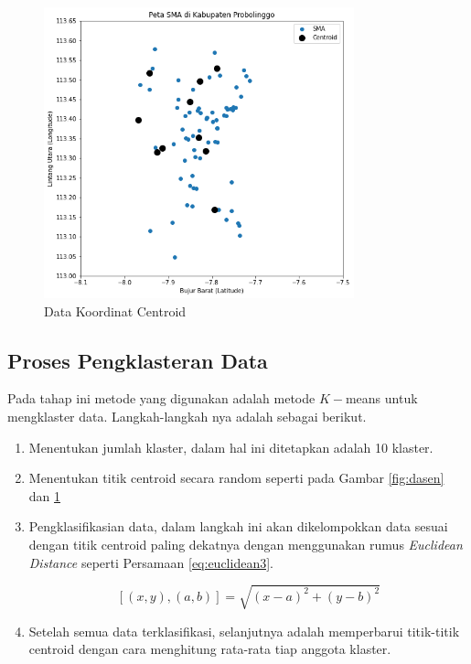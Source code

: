 \begin{figure}[h!]
	\centering
	\includegraphics[width=0.8\textwidth]{titik centroid.png}
	\caption{Data Koordinat Centroid}
	\label{fig:visdasen}
\end{figure}

\subsection{Proses Pengklasteran Data}

Pada tahap ini metode yang digunakan adalah metode $K-$means untuk mengklaster data. Langkah-langkah nya adalah sebagai berikut.

\begin{enumerate}
	\item Menentukan jumlah klaster, dalam hal ini ditetapkan adalah 10 klaster.
	\item Menentukan titik centroid secara random seperti pada Gambar \ref{fig:dasen} dan \ref{fig:visdasen}
	\item Pengklasifikasian data, dalam langkah ini akan dikelompokkan data sesuai dengan titik centroid paling dekatnya dengan menggunakan rumus \textit{Euclidean Distance} seperti Persamaan \ref{eq:euclidean3}.
	
	\begin{equation}
	\left[ \left( x,y \right) ,\left( a,b \right)\right]=\sqrt{\left( x-a \right)^{2}+\left( y-b \right)^{2}}
	\label{eq:euclidean3}
	\end{equation}
	
	\item Setelah semua data terklasifikasi, selanjutnya adalah memperbarui titik-titik centroid dengan cara menghitung rata-rata tiap anggota klaster.
\end{enumerate}
